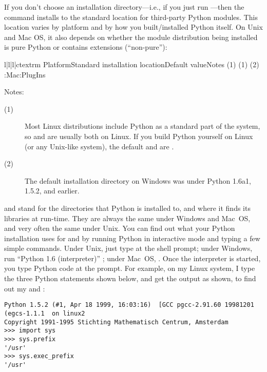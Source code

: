 \documentclass{howto}
\begin{document}
If you don't choose an installation directory---i.e., if you just run
---then the  command installs to
the standard location for third-party Python modules.  This location
varies by platform and by how you built/installed Python itself.  On
Unix and Mac OS, it also depends on whether the module distribution
being installed is pure Python or contains extensions (``non-pure''):
\begin{tableiv}{l|l|l|c}{textrm}%
  {Platform}{Standard installation location}{Default value}{Notes}
          {}
          {}
          {(1)}
          {}
          {}
          {(1)}
          {}
          {}
          {(2)}
          {}
          {  }
          {}
          {:Mac:PlugIns}
          {}
          {}
\end{tableiv}

\noindent Notes:
\begin{description}
\item[(1)] Most Linux distributions include Python as a standard part of
  the system, so  and  are usually
  both  on Linux.  If you build Python yourself on Linux (or
  any Unix-like system), the default  and
   are .
\item[(2)] The default installation directory on Windows was
   under Python 1.6a1,
  1.5.2, and earlier.
\end{description}

 and  stand for the directories
that Python is installed to, and where it finds its libraries at
run-time.  They are always the same under Windows and Mac~OS, and very
often the same under Unix.  You can find out what your Python
installation uses for  and  by
running Python in interactive mode and typing a few simple commands.
Under Unix, just type  at the shell prompt; under Windows,
run ``Python 1.6 (interpreter)'' ; under Mac~OS, .
Once the interpreter is started, you type Python code at the \code{>>>}
prompt.  For example, on my Linux system, I type the three Python
statements shown below, and get the output as shown, to find out my
 and :
\begin{verbatim}
Python 1.5.2 (#1, Apr 18 1999, 16:03:16)  [GCC pgcc-2.91.60 19981201 (egcs-1.1.1  on linux2
Copyright 1991-1995 Stichting Mathematisch Centrum, Amsterdam
>>> import sys
>>> sys.prefix
'/usr'
>>> sys.exec_prefix
'/usr'
\end{verbatim}
\end{document}
